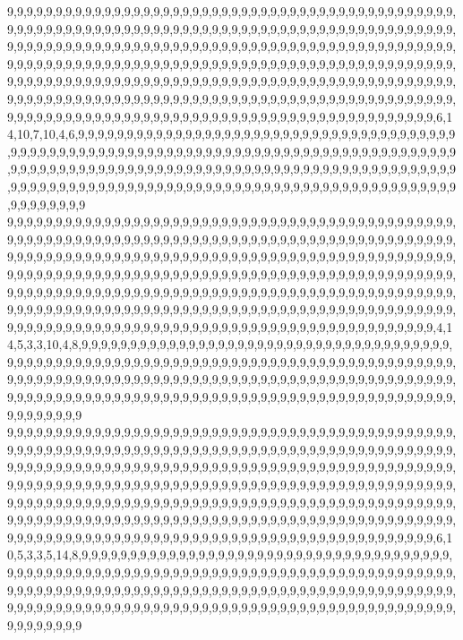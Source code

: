 9,9,9,9,9,9,9,9,9,9,9,9,9,9,9,9,9,9,9,9,9,9,9,9,9,9,9,9,9,9,9,9,9,9,9,9,9,9,9,9,9,9,9,9,9,9,9,9,9,9,9,9,9,9,9,9,9,9,9,9,9,9,9,9,9,9,9,9,9,9,9,9,9,9,9,9,9,9,9,9,9,9,9,9,9,9,9,9,9,9,9,9,9,9,9,9,9,9,9,9,9,9,9,9,9,9,9,9,9,9,9,9,9,9,9,9,9,9,9,9,9,9,9,9,9,9,9,9,9,9,9,9,9,9,9,9,9,9,9,9,9,9,9,9,9,9,9,9,9,9,9,9,9,9,9,9,9,9,9,9,9,9,9,9,9,9,9,9,9,9,9,9,9,9,9,9,9,9,9,9,9,9,9,9,9,9,9,9,9,9,9,9,9,9,9,9,9,9,9,9,9,9,9,9,9,9,9,9,9,9,9,9,9,9,9,9,9,9,9,9,9,9,9,9,9,9,9,9,9,9,9,9,9,9,9,9,9,9,9,9,9,9,9,9,9,9,9,9,9,9,9,9,9,9,9,9,9,9,9,9,9,9,9,9,9,9,9,9,9,9,9,9,9,9,9,9,9,9,9,9,9,9,9,9,9,9,9,9,9,9,9,9,9,9,9,9,9,9,9,9,9,9,9,9,9,9,9,9,9,9,9,9,9,9,9,9,9,9,9,9,6,14,10,7,10,4,6,9,9,9,9,9,9,9,9,9,9,9,9,9,9,9,9,9,9,9,9,9,9,9,9,9,9,9,9,9,9,9,9,9,9,9,9,9,9,9,9,9,9,9,9,9,9,9,9,9,9,9,9,9,9,9,9,9,9,9,9,9,9,9,9,9,9,9,9,9,9,9,9,9,9,9,9,9,9,9,9,9,9,9,9,9,9,9,9,9,9,9,9,9,9,9,9,9,9,9,9,9,9,9,9,9,9,9,9,9,9,9,9,9,9,9,9,9,9,9,9,9,9,9,9,9,9,9,9,9,9,9,9,9,9,9,9,9,9,9,9,9,9,9,9,9,9,9,9,9,9,9,9,9,9,9,9,9,9,9,9,9,9,9,9,9,9,9,9,9,9,9,9,9,9,9,9,9,9,9,9,9,9,9,9,9
9,9,9,9,9,9,9,9,9,9,9,9,9,9,9,9,9,9,9,9,9,9,9,9,9,9,9,9,9,9,9,9,9,9,9,9,9,9,9,9,9,9,9,9,9,9,9,9,9,9,9,9,9,9,9,9,9,9,9,9,9,9,9,9,9,9,9,9,9,9,9,9,9,9,9,9,9,9,9,9,9,9,9,9,9,9,9,9,9,9,9,9,9,9,9,9,9,9,9,9,9,9,9,9,9,9,9,9,9,9,9,9,9,9,9,9,9,9,9,9,9,9,9,9,9,9,9,9,9,9,9,9,9,9,9,9,9,9,9,9,9,9,9,9,9,9,9,9,9,9,9,9,9,9,9,9,9,9,9,9,9,9,9,9,9,9,9,9,9,9,9,9,9,9,9,9,9,9,9,9,9,9,9,9,9,9,9,9,9,9,9,9,9,9,9,9,9,9,9,9,9,9,9,9,9,9,9,9,9,9,9,9,9,9,9,9,9,9,9,9,9,9,9,9,9,9,9,9,9,9,9,9,9,9,9,9,9,9,9,9,9,9,9,9,9,9,9,9,9,9,9,9,9,9,9,9,9,9,9,9,9,9,9,9,9,9,9,9,9,9,9,9,9,9,9,9,9,9,9,9,9,9,9,9,9,9,9,9,9,9,9,9,9,9,9,9,9,9,9,9,9,9,9,9,9,9,9,9,9,9,9,9,9,9,9,9,9,9,9,9,4,14,5,3,3,10,4,8,9,9,9,9,9,9,9,9,9,9,9,9,9,9,9,9,9,9,9,9,9,9,9,9,9,9,9,9,9,9,9,9,9,9,9,9,9,9,9,9,9,9,9,9,9,9,9,9,9,9,9,9,9,9,9,9,9,9,9,9,9,9,9,9,9,9,9,9,9,9,9,9,9,9,9,9,9,9,9,9,9,9,9,9,9,9,9,9,9,9,9,9,9,9,9,9,9,9,9,9,9,9,9,9,9,9,9,9,9,9,9,9,9,9,9,9,9,9,9,9,9,9,9,9,9,9,9,9,9,9,9,9,9,9,9,9,9,9,9,9,9,9,9,9,9,9,9,9,9,9,9,9,9,9,9,9,9,9,9,9,9,9,9,9,9,9,9,9,9,9,9,9,9,9,9,9,9,9,9,9,9,9,9,9
9,9,9,9,9,9,9,9,9,9,9,9,9,9,9,9,9,9,9,9,9,9,9,9,9,9,9,9,9,9,9,9,9,9,9,9,9,9,9,9,9,9,9,9,9,9,9,9,9,9,9,9,9,9,9,9,9,9,9,9,9,9,9,9,9,9,9,9,9,9,9,9,9,9,9,9,9,9,9,9,9,9,9,9,9,9,9,9,9,9,9,9,9,9,9,9,9,9,9,9,9,9,9,9,9,9,9,9,9,9,9,9,9,9,9,9,9,9,9,9,9,9,9,9,9,9,9,9,9,9,9,9,9,9,9,9,9,9,9,9,9,9,9,9,9,9,9,9,9,9,9,9,9,9,9,9,9,9,9,9,9,9,9,9,9,9,9,9,9,9,9,9,9,9,9,9,9,9,9,9,9,9,9,9,9,9,9,9,9,9,9,9,9,9,9,9,9,9,9,9,9,9,9,9,9,9,9,9,9,9,9,9,9,9,9,9,9,9,9,9,9,9,9,9,9,9,9,9,9,9,9,9,9,9,9,9,9,9,9,9,9,9,9,9,9,9,9,9,9,9,9,9,9,9,9,9,9,9,9,9,9,9,9,9,9,9,9,9,9,9,9,9,9,9,9,9,9,9,9,9,9,9,9,9,9,9,9,9,9,9,9,9,9,9,9,9,9,9,9,9,9,9,9,9,9,9,9,9,9,9,9,9,9,9,9,9,9,9,9,9,6,10,5,3,3,5,14,8,9,9,9,9,9,9,9,9,9,9,9,9,9,9,9,9,9,9,9,9,9,9,9,9,9,9,9,9,9,9,9,9,9,9,9,9,9,9,9,9,9,9,9,9,9,9,9,9,9,9,9,9,9,9,9,9,9,9,9,9,9,9,9,9,9,9,9,9,9,9,9,9,9,9,9,9,9,9,9,9,9,9,9,9,9,9,9,9,9,9,9,9,9,9,9,9,9,9,9,9,9,9,9,9,9,9,9,9,9,9,9,9,9,9,9,9,9,9,9,9,9,9,9,9,9,9,9,9,9,9,9,9,9,9,9,9,9,9,9,9,9,9,9,9,9,9,9,9,9,9,9,9,9,9,9,9,9,9,9,9,9,9,9,9,9,9,9,9,9,9,9,9,9,9,9,9,9,9,9,9,9,9,9,9
